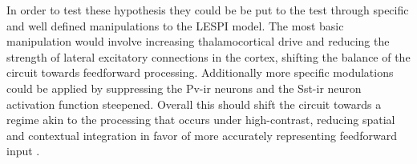 In order to test these hypothesis they could be be put to the test
through specific and well defined manipulations to the LESPI
model. The most basic manipulation would involve increasing
thalamocortical drive and reducing the strength of lateral excitatory
connections in the cortex, shifting the balance of the circuit towards
feedforward processing. Additionally more specific modulations could
be applied by suppressing the Pv-ir neurons and the Sst-ir neuron
activation function steepened. Overall this should shift the circuit
towards a regime akin to the processing that occurs under
high-contrast, reducing spatial and contextual integration in favor of
more accurately representing feedforward input \citep{Roberts2005,
  Roberts2008a, Roberts2008b}.

